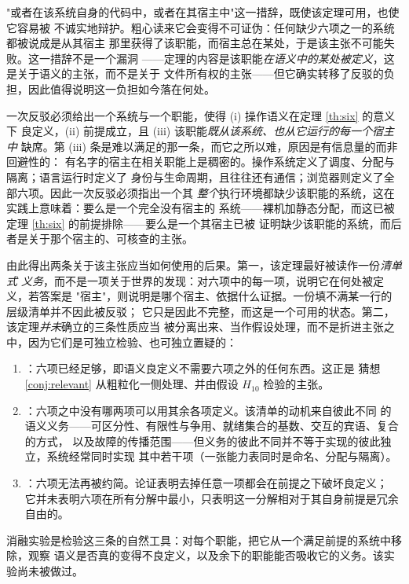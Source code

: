 \begin{remark}\label{rmk:six-escape}
"或者在该系统自身的代码中，或者在其宿主中"这一措辞，既使该定理可用，也使它容易被
不诚实地辩护。粗心读来它会变得不可证伪：任何缺少六项之一的系统都被说成是从其宿主
那里获得了该职能，而宿主总在某处，于是该主张不可能失败。这一措辞不是一个漏洞
——定理的内容是该职能\emph{在语义中的某处被定义}，这是关于语义的主张，而不是关于
文件所有权的主张——但它确实转移了反驳的负担，因此值得说明这一负担如今落在何处。

一次反驳必须给出一个系统与一个职能，使得 (i) 操作语义在定理 \ref{th:six} 的意义下
良定义，(ii) 前提成立，且 (iii) 该职能\emph{既从该系统、也从它运行的每一个宿主中}
缺席。第 (iii) 条是难以满足的那一条，而它之所以难，原因是有信息量的而非回避性的：
有名字的宿主在相关职能上是稠密的。操作系统定义了调度、分配与隔离；语言运行时定义了
身份与生命周期，且往往还有通信；浏览器则定义了全部六项。因此一次反驳必须指出一个其
\emph{整个}执行环境都缺少该职能的系统，这在实践上意味着：要么是一个完全没有宿主的
系统——裸机加静态分配，而这已被定理 \ref{th:six} 的前提排除——要么是一个其宿主已被
证明缺少该职能的系统，而后者是关于那个宿主的、可核查的主张。

由此得出两条关于该主张应当如何使用的后果。第一，该定理最好被读作一份\emph{清单式
义务}，而不是一项关于世界的发现：对六项中的每一项，说明它在何处被定义，若答案是
"宿主"，则说明是哪个宿主、依据什么证据。一份填不满某一行的层级清单并不因此被反驳；
它只是因此不完整，而这是一个可用的状态。第二，该定理\emph{并未}确立的三条性质应当
被分离出来、当作假设处理，而不是折进主张之中，因为它们是可独立检验、也可独立置疑的：
\begin{enumerate}[label=(\alph*)]
\item {}：六项已经足够，即语义良定义不需要六项之外的任何东西。这正是
      猜想 \ref{conj:relevant} 从粗粒化一侧处理、并由假设 $H_{10}$ 检验的主张。
\item {}：六项之中没有哪两项可以用其余各项定义。该清单的动机来自彼此不同
      的语义义务——可区分性、有限性与争用、就绪集合的基数、交互的宾语、复合的方式，
      以及故障的传播范围——但义务的彼此不同并不等于实现的彼此独立，系统经常同时实现
      其中若干项（一张能力表同时是命名、分配与隔离）。
\item {}：六项无法再被约简。论证表明去掉任意一项都会在前提之下破坏良定义；
      它并未表明六项在所有分解中最小，只表明这一分解相对于其自身前提是冗余自由的。
\end{enumerate}
消融实验是检验这三条的自然工具：对每个职能，把它从一个满足前提的系统中移除，观察
语义是否真的变得不良定义，以及余下的职能能否吸收它的义务。该实验尚未被做过。
\end{remark}

